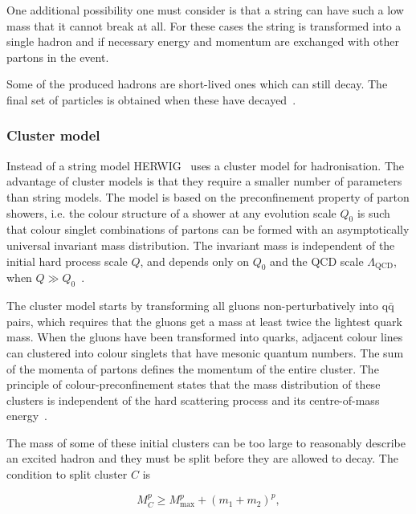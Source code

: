 One additional possibility one must consider is that a string can have such a low mass that it cannot break at all. For these cases the string is transformed into a single hadron and if necessary energy and momentum are exchanged with other partons in the event.

Some of the produced hadrons are short-lived ones which can still decay. The final set of particles is obtained when these have decayed~\cite{introPythia82}.


\subsubsection*{Cluster model}
Instead of a string model HERWIG~\cite{herwigManual} uses a cluster model for hadronisation. The advantage of cluster models is that they require a smaller number of parameters than string models. The model is based on the preconfinement property of parton showers, i.e. the colour structure of a shower at any evolution scale $Q_0$ is such that colour singlet combinations of partons can be formed with an asymptotically universal invariant mass distribution. The invariant mass is independent of the initial hard process scale $Q$, and depends only on $Q_0$ and the QCD scale $\Lambda _ \mathrm{QCD}$, when $Q \gg Q_0$~\cite{eventGenerators}.

The cluster model starts by transforming all gluons non-perturbatively into $\mathrm{q \bar q}$ pairs, which requires that the gluons get a mass at least twice the lightest quark mass. When the gluons have been transformed into quarks, adjacent colour lines can clustered into colour singlets that have mesonic quantum numbers. The sum of the momenta of partons defines the momentum of the entire cluster. The principle of colour-preconfinement states that the mass distribution of these clusters is independent of the hard scattering process and its centre-of-mass energy~\cite{herwigManual}. %

The mass of some of these initial clusters can be too large to reasonably describe an excited hadron and they must be split before they are allowed to decay. The condition to split cluster $C$ is~\cite{herwigManual}

\begin{equation}
M_C^p \geq M_\mathrm{max}^p  + \left( m_1 + m_2\right)^p,
\label{eq:clustermass}
\end{equation}

